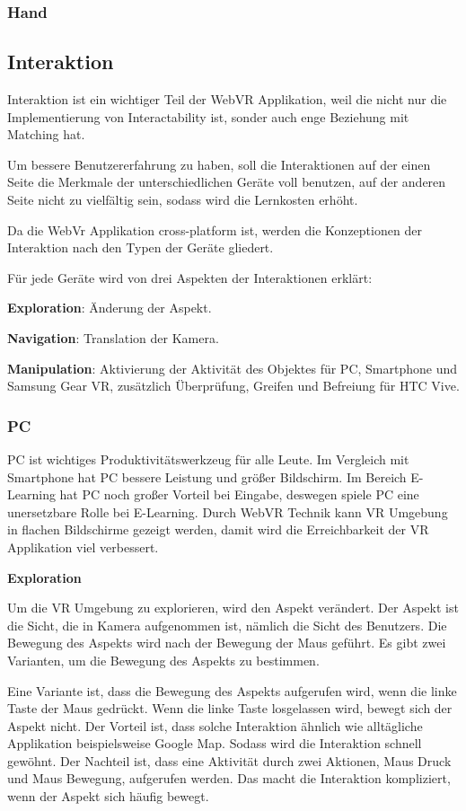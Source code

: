    \subsubsection{Hand}

 \subsection{Interaktion}
 Interaktion ist ein wichtiger Teil der WebVR Applikation, weil die nicht nur die Implementierung von Interactability ist, sonder auch enge Beziehung mit Matching hat.
 
 Um bessere Benutzererfahrung zu haben, soll die Interaktionen auf der einen Seite die Merkmale der unterschiedlichen Geräte voll benutzen, auf der anderen Seite nicht zu vielfältig sein, sodass wird die Lernkosten erhöht. 
 
 Da die WebVr Applikation cross-platform ist, werden die Konzeptionen der Interaktion nach den Typen der Geräte gliedert.

 Für jede Geräte wird von drei Aspekten der Interaktionen erklärt:
 
 \textbf{Exploration}: Änderung der Aspekt.
 
 \textbf{Navigation}: Translation der Kamera.
 
 \textbf{Manipulation}: Aktivierung der Aktivität des Objektes für PC, Smartphone und Samsung Gear VR, zusätzlich Überprüfung, Greifen und Befreiung für HTC Vive.

 \subsubsection{PC}
 PC ist wichtiges Produktivitätswerkzeug für alle Leute. Im Vergleich mit Smartphone hat PC bessere Leistung und größer Bildschirm. Im Bereich E-Learning hat PC noch großer Vorteil bei Eingabe, deswegen spiele PC eine unersetzbare Rolle bei E-Learning. Durch WebVR Technik kann VR Umgebung in flachen Bildschirme gezeigt werden, damit wird die Erreichbarkeit der VR Applikation viel verbessert. 
 
  \textbf{Exploration}
  
  Um die VR Umgebung zu explorieren, wird den Aspekt verändert. Der Aspekt ist die Sicht, die in Kamera aufgenommen ist, nämlich die Sicht des Benutzers. Die Bewegung des Aspekts wird nach der Bewegung der Maus geführt. Es gibt zwei Varianten, um die Bewegung des Aspekts zu bestimmen.
  
  Eine Variante ist, dass die Bewegung des Aspekts aufgerufen wird, wenn die linke Taste der Maus gedrückt. Wenn die linke Taste losgelassen wird, bewegt sich der Aspekt nicht. Der Vorteil ist, dass solche Interaktion ähnlich wie alltägliche Applikation beispielsweise Google Map. Sodass wird die Interaktion schnell gewöhnt. Der Nachteil ist, dass eine Aktivität durch zwei Aktionen, Maus Druck und Maus Bewegung, aufgerufen werden. Das macht die Interaktion kompliziert, wenn der Aspekt sich häufig bewegt.
  
